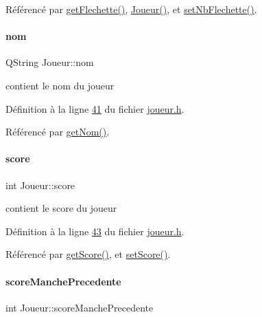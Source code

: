 Référencé par \hyperlink{joueur_8cpp_source_l00068}{get\+Flechette()}, \hyperlink{joueur_8cpp_source_l00024}{Joueur()}, et \hyperlink{joueur_8cpp_source_l00157}{set\+Nb\+Flechette()}.

\mbox{\label{class_joueur_ab06d7f1e6b482299bb03919e0cd2166d}} 
\paragraph{\texorpdfstring{nom}{nom}}
{\footnotesize\ttfamily Q\+String Joueur\+::nom\hspace{0.3cm}{\ttfamily [private]}}



contient le nom du joueur 



Définition à la ligne \hyperlink{joueur_8h_source_l00041}{41} du fichier \hyperlink{joueur_8h_source}{joueur.\+h}.



Référencé par \hyperlink{joueur_8cpp_source_l00035}{get\+Nom()}.

\mbox{\label{class_joueur_a680896b9ff71c2762ae653ef6aa7c8ce}} 
\paragraph{\texorpdfstring{score}{score}}
{\footnotesize\ttfamily int Joueur\+::score\hspace{0.3cm}{\ttfamily [private]}}



contient le score du joueur 



Définition à la ligne \hyperlink{joueur_8h_source_l00043}{43} du fichier \hyperlink{joueur_8h_source}{joueur.\+h}.



Référencé par \hyperlink{joueur_8cpp_source_l00046}{get\+Score()}, et \hyperlink{joueur_8cpp_source_l00135}{set\+Score()}.

\mbox{\label{class_joueur_ac78f2e83781d2bdeb9a613dc37812736}} 
\paragraph{\texorpdfstring{score\+Manche\+Precedente}{scoreManchePrecedente}}
{\footnotesize\ttfamily int Joueur\+::score\+Manche\+Precedente\hspace{0.3cm}{\ttfamily [private]}}



